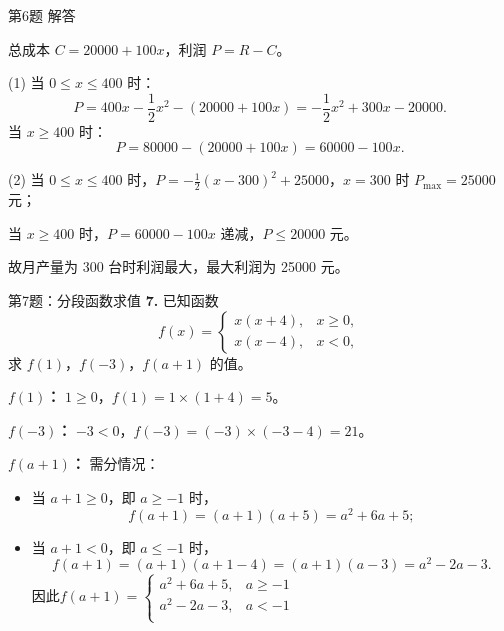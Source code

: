\documentclass[10pt,aspectratio=169,serif,fleqn]{beamer}
\begin{document}
\begin{frame}[t]{第6题 解答}\vspace{-2em}
\begin{tcolorbox}[colback=orange!10,colframe=orange,title=\textbf{解}]
总成本 $C=20000+100x$，利润 $P=R-C$。

\vspace{0.3em}
(1) 当 $0\le x\le400$ 时：
\[
P=400x-\frac12x^2-(20000+100x)=-\frac12x^2+300x-20000.
\]
当 $x\ge400$ 时：
\[
P=80000-(20000+100x)=60000-100x.
\]

\vspace{0.5em}
(2) 当 $0\le x\le400$ 时，$P=-\frac12(x-300)^2+25000$，$x=300$ 时 $P_{\max}=25000$ 元；

当 $x\ge400$ 时，$P=60000-100x$ 递减，$P\le20000$ 元。

\vspace{0.3em}
故月产量为 \alert{300 台}时利润最大，最大利润为 \alert{25000 元}。
\end{tcolorbox}
\end{frame}

\begin{frame}[t]{第7题：分段函数求值}
\textbf{7.} 已知函数
\[
f(x)=\begin{cases}
x(x+4), & x\ge0,\\
x(x-4), & x <0,
\end{cases}
\]
求 $f(1)$，$f(-3)$，$f(a+1)$ 的值。
\end{frame}

\begin{frame}[t]{}\vspace{-1em}
\begin{tcolorbox}[colback=orange!10,colframe=orange,title=\textbf{解}]
\textbf{$f(1)$：} $1\ge0$，$f(1)=1\times(1+4)=5$。

\vspace{0.5em}
\textbf{$f(-3)$：} $-3< 0$，$f(-3)=(-3)\times(-3-4)=21$。

\vspace{0.5em}
\textbf{$f(a+1)$：} 需分情况：
\begin{itemize}
  \item 当 $a+1\ge0$，即 $a\ge-1$ 时，
  \[
  f(a+1)=(a+1)(a+5)=a^2+6a+5;
  \]
  \item 当 $a+1< 0$，即 $a\le-1$ 时，
  \[
  f(a+1)=(a+1)(a+1-4)=(a+1)(a-3)=a^2-2a-3.
  \]
  因此$f(a+1) =
  \begin{cases}
  	a^2 +6a+5,&a \geqslant -1\\
  		a^2 -2a -3,&a<-1\\ 	
  \end{cases}$
\end{itemize}
\end{tcolorbox}
\end{frame}
\end{document}
